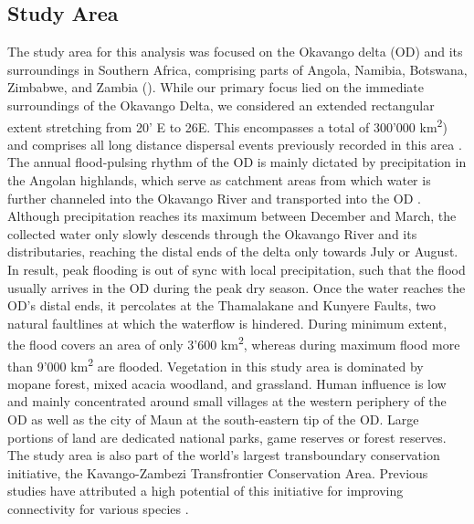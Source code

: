 \documentclass[abstract=on,10pt,a4paper,bibliography=totocnumbered]{article}
\begin{document}
\subsection{Study Area}
The study area for this analysis was focused on the Okavango delta (OD) and its
surroundings in Southern Africa, comprising parts of Angola, Namibia, Botswana,
Zimbabwe, and Zambia (). While our primary focus lied on the
immediate surroundings of the Okavango Delta, we considered an extended
rectangular extent stretching from 20' E to 26\degree E. This
encompasses a total of 300'000 km\textsuperscript{2}) and comprises all long
distance dispersal events previously recorded in this area \citep{Cozzi.2020,
Hofmann.2021}. The annual flood-pulsing rhythm of the OD is mainly dictated by
precipitation in the Angolan highlands, which serve as catchment areas from
which water is further channeled into the Okavango River and transported into
the OD \citep{Wolski.2017}. Although precipitation reaches its maximum between
December and March, the collected water only slowly descends through the
Okavango River and its distributaries, reaching the distal ends of the delta
only towards July or August. In result, peak flooding is out of sync with local
precipitation, such that the flood usually arrives in the OD during the peak dry
season. Once the water reaches the OD's distal ends, it percolates at the
Thamalakane and Kunyere Faults, two natural faultlines at which the waterflow is
hindered. During minimum extent, the flood covers an area of only 3'600
km\textsuperscript{2}, whereas during maximum flood more than 9'000
km\textsuperscript{2} are flooded. Vegetation in this study area is dominated by
mopane forest, mixed acacia woodland, and grassland. Human influence is low and
mainly concentrated around small villages at the western periphery of the OD as
well as the city of Maun at the south-eastern tip of the OD. Large portions of
land are dedicated national parks, game reserves or forest reserves. The study
area is also part of the world's largest transboundary conservation initiative,
the Kavango-Zambezi Transfrontier Conservation Area. Previous studies have
attributed a high potential of this initiative for improving connectivity for
various species \citep{Brennan.2020, Lines.2021, Hofmann.2021}.
\end{document}
